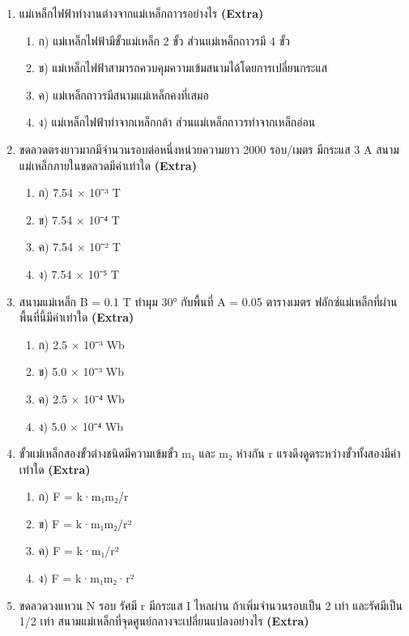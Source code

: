 \documentclass[12pt]{article}
\begin{document}
\begin{enumerate}[label=\arabic*.]
\begin{enumerate}[label=)]
\item ก) 0°
\item ข) 45°
\item ค) 90°
\item ง) 180°
\end{enumerate}
\item แม่เหล็กไฟฟ้าทำงานต่างจากแม่เหล็กถาวรอย่างไร \hfill \textbf{\small (Extra)}
\begin{enumerate}[label=)]
\item ก) แม่เหล็กไฟฟ้ามีขั้วแม่เหล็ก 2 ขั้ว ส่วนแม่เหล็กถาวรมี 4 ขั้ว
\item ข) แม่เหล็กไฟฟ้าสามารถควบคุมความเข้มสนามได้โดยการเปลี่ยนกระแส
\item ค) แม่เหล็กถาวรมีสนามแม่เหล็กคงที่เสมอ
\item ง) แม่เหล็กไฟฟ้าทำจากเหล็กกล้า ส่วนแม่เหล็กถาวรทำจากเหล็กอ่อน
\end{enumerate}
\item ขดลวดตรงยาวมากมีจำนวนรอบต่อหนึ่งหน่วยความยาว 2000 รอบ/เมตร มีกระแส 3 A สนามแม่เหล็กภายในขดลวดมีค่าเท่าใด \hfill \textbf{\small (Extra)}
\begin{enumerate}[label=)]
\item ก) 7.54 × 10⁻³ T
\item ข) 7.54 × 10⁻⁴ T
\item ค) 7.54 × 10⁻² T
\item ง) 7.54 × 10⁻⁵ T
\end{enumerate}
\item สนามแม่เหล็ก B = 0.1 T ทำมุม 30° กับพื้นที่ A = 0.05 ตารางเมตร ฟลักซ์แม่เหล็กที่ผ่านพื้นที่นี้มีค่าเท่าใด \hfill \textbf{\small (Extra)}
\begin{enumerate}[label=)]
\item ก) 2.5 × 10⁻³ Wb
\item ข) 5.0 × 10⁻³ Wb
\item ค) 2.5 × 10⁻⁴ Wb
\item ง) 5.0 × 10⁻⁴ Wb
\end{enumerate}
\item ขั้วแม่เหล็กสองขั้วต่างชนิดมีความเข้มขั้ว m₁ และ m₂ ห่างกัน r แรงดึงดูดระหว่างขั้วทั้งสองมีค่าเท่าใด \hfill \textbf{\small (Extra)}
\begin{enumerate}[label=)]
\item ก) F = k·m₁m₂/r
\item ข) F = k·m₁m₂/r²
\item ค) F = k·m₁/r²
\item ง) F = k·m₁m₂·r²
\end{enumerate}
\item ขดลวดวงแหวน N รอบ รัศมี r มีกระแส I ไหลผ่าน ถ้าเพิ่มจำนวนรอบเป็น 2 เท่า และรัศมีเป็น 1/2 เท่า สนามแม่เหล็กที่จุดศูนย์กลางจะเปลี่ยนแปลงอย่างไร \hfill \textbf{\small (Extra)}

\end{enumerate}
\end{document}
